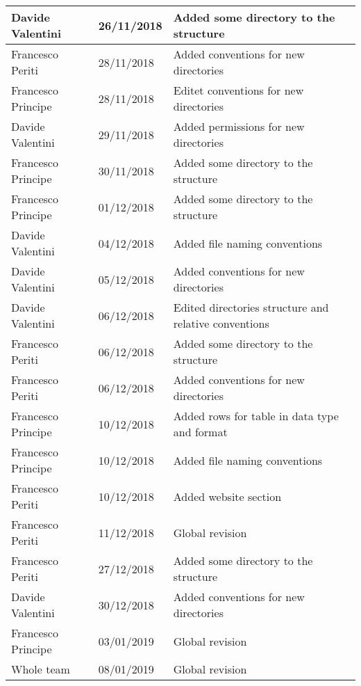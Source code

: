 \begin{table}[H]
\begin{tabularx}{\textwidth}{|l|l|X|}
Davide Valentini & 26/11/2018 & Added some directory to the structure\\ \hline
Francesco Periti & 28/11/2018 & Added conventions for new directories\\ \hline
Francesco Principe & 28/11/2018 & Editet conventions for new directories\\ \hline
Davide Valentini & 29/11/2018 & Added permissions for new directories\\ \hline
Francesco Principe & 30/11/2018 & Added some directory to the structure\\ \hline
Francesco Principe & 01/12/2018 & Added some directory to the structure\\ \hline
Davide Valentini & 04/12/2018 & Added file naming conventions\\ \hline
Davide Valentini & 05/12/2018 & Added conventions for new directories\\ \hline
Davide Valentini & 06/12/2018 & Edited directories structure and relative conventions\\ \hline
Francesco Periti & 06/12/2018 & Added some directory to the structure\\ \hline
Francesco Periti & 06/12/2018 & Added conventions for new directories\\ \hline
Francesco Principe & 10/12/2018 &  Added rows for table in data type and format\\ \hline
Francesco Principe & 10/12/2018 & Added file naming conventions\\ \hline
Francesco Periti & 10/12/2018 & Added website section\\ \hline
Francesco Periti & 11/12/2018 & Global revision\\ \hline
Francesco Periti & 27/12/2018 & Added some directory to the structure\\ \hline
Davide Valentini & 30/12/2018 & Added conventions for new directories\\ \hline
Francesco Principe & 03/01/2019 & Global revision\\ \hline
Whole team & 08/01/2019 & Global revision \\ \hline
\end{tabularx}
\end{table}
